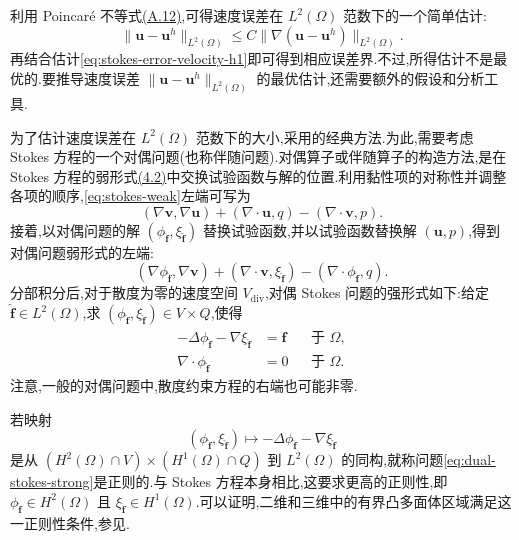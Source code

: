 \begin{note}\label{note:stokes-error-velocity-l2}
利用 Poincaré 不等式\hyperref[eq:appendix-a-12]{(A.12)},可得速度误差在 $L^2(\Omega)$ 范数下的一个简单估计:
\[
  \|\bm{u}-\bm{u}^h\|_{L^2(\Omega)}
     \leq C\|\nabla(\bm{u}-\bm{u}^h)\|_{L^2(\Omega)}.
\]
再结合估计\cref{eq:stokes-error-velocity-h1}即可得到相应误差界.不过,所得估计不是最优的.要推导速度误差 $\|\bm{u}-\bm{u}^h\|_{L^2(\Omega)}$ 的最优估计,还需要额外的假设和分析工具.
\end{note}

\begin{note}\label{note:stokes-regular-dual-problem}
为了估计速度误差在 $L^2(\Omega)$ 范数下的大小,采用\textcite{Aubin1967,Nitsche1968}的经典方法.为此,需要考虑 Stokes 方程的一个对偶问题(也称伴随问题).对偶算子或伴随算子的构造方法,是在 Stokes 方程的弱形式\hyperref[eq:stokes-weak]{(4.2)}中交换试验函数与解的位置.利用黏性项的对称性并调整各项的顺序,\cref{eq:stokes-weak}左端可写为
\[
  (\nabla\bm{v},\nabla\bm{u})
  +(\nabla\cdot\bm{u},q)
  -(\nabla\cdot\bm{v},p).
\]
接着,以对偶问题的解 $(\phi_{\widehat{\bm{f}}},\xi_{\widehat{\bm{f}}})$ 替换试验函数,并以试验函数替换解 $(\bm{u},p)$,得到对偶问题弱形式的左端:
\[
  (\nabla\phi_{\widehat{\bm{f}}},\nabla\bm{v})
  +(\nabla\cdot\bm{v},\xi_{\widehat{\bm{f}}})
  -(\nabla\cdot\phi_{\widehat{\bm{f}}},q).
\]
分部积分后,对于散度为零的速度空间 $V_{\mathrm{div}}$,对偶 Stokes 问题的强形式如下:给定 $\widehat{\bm{f}}\in L^2(\Omega)$,求 $(\phi_{\widehat{\bm{f}}},\xi_{\widehat{\bm{f}}})\in V\times Q$,使得
\begin{equation}\label{eq:dual-stokes-strong}
\begin{aligned}
  -\Delta\phi_{\widehat{\bm{f}}}
  -\nabla\xi_{\widehat{\bm{f}}}
    &=\widehat{\bm{f}} &&\text{于 }\Omega,\\
  \nabla\cdot\phi_{\widehat{\bm{f}}}
    &=0 &&\text{于 }\Omega.
\end{aligned}
\end{equation}
注意,一般的对偶问题中,散度约束方程的右端也可能非零.

若映射
\begin{equation}\label{eq:dual-stokes-regularity-map}
  (\phi_{\widehat{\bm{f}}},\xi_{\widehat{\bm{f}}})
  \longmapsto
  -\Delta\phi_{\widehat{\bm{f}}}
  -\nabla\xi_{\widehat{\bm{f}}}
\end{equation}
是从 $(H^2(\Omega)\cap V)\times(H^1(\Omega)\cap Q)$ 到 $L^2(\Omega)$ 的同构,就称问题\cref{eq:dual-stokes-strong}是正则的.与 Stokes 方程本身相比,这要求更高的正则性,即 $\phi_{\widehat{\bm{f}}}\in H^2(\Omega)$ 且 $\xi_{\widehat{\bm{f}}}\in H^1(\Omega)$.可以证明,二维和三维中的有界凸多面体区域满足这一正则性条件,参见\textcite{KelloggOsborn1976,Dauge1989}.
\end{note}

